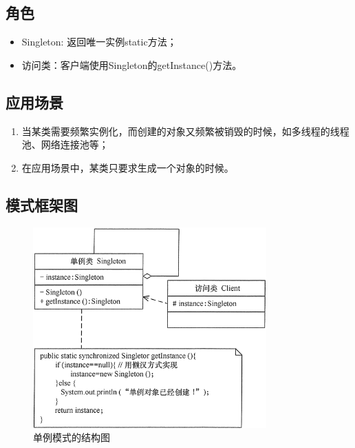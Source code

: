 \subsection{角色}
\begin{itemize}
	\item Singleton: 返回唯一实例static方法；
	\item 访问类：客户端使用Singleton的getInstance()方法。
\end{itemize}
\subsection{应用场景}
\begin{enumerate}
	\item 当某类需要频繁实例化，而创建的对象又频繁被销毁的时候，如多线程的线程池、网络连接池等；
	\item 在应用场景中，某类只要求生成一个对象的时候。
\end{enumerate}
\subsection{模式框架图}
\begin{figure}[!h]
	\centering
	\includegraphics[width=0.8\textwidth]{image/5-1}
	\caption{单例模式的结构图}
\end{figure}
